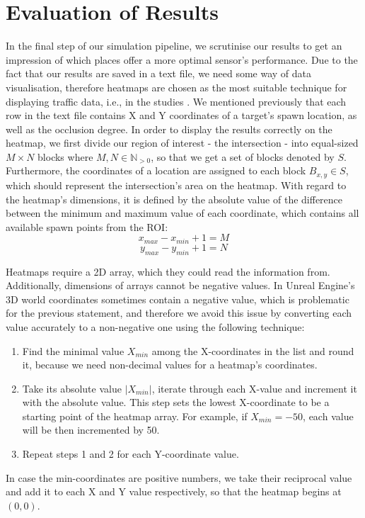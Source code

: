  \section{Evaluation of Results}
 In the final step of our simulation pipeline, we scrutinise our results to get an impression of which places offer a more optimal sensor's performance. Due to the fact that our results are saved in a text file, we need some way of data visualisation, therefore heatmaps are chosen as the most suitable technique for displaying traffic data, i.e., in the studies \cite{heatmap_first, heatmap_second}. We mentioned previously that each row in the text file contains X and Y coordinates of a target's spawn location, as well as the occlusion degree. In order to display the results correctly on the heatmap, we first divide our region of interest - the intersection - into equal-sized $M \times N$ blocks where $M,N \in \mathbb{N}_{>0}$, so that we get a set of blocks denoted by $S$. Furthermore, the coordinates of a location are assigned to each block $B_{x,y} \in S$, which should represent the intersection's area on the heatmap. With regard to the heatmap's dimensions, it is defined by the absolute value of the difference between the minimum and maximum value of each coordinate, which contains all available spawn points from the ROI:
 \begin{equation}
     x_{max} - x_{min} + 1 = M
 \end{equation}
 \begin{equation}
     y_{max} - y_{min} + 1 = N
 \end{equation}
 
 Heatmaps require a 2D array, which they could read the information from. Additionally, dimensions of arrays cannot be negative values. In Unreal Engine's 3D world coordinates sometimes contain a negative value, which is problematic for the previous statement, and therefore we avoid this issue by converting each value accurately to a non-negative one using the following technique:
 \begin{enumerate}
     \item Find the minimal value $X_{min}$ among the X-coordinates in the list and round it, because we need non-decimal values for a heatmap's coordinates.
     \item Take its absolute value $|X_{min}|$, iterate through each X-value and increment it with the absolute value. This step sets the lowest X-coordinate to be a starting point of the heatmap array. For example, if $X_{min} = -50$, each value will be then incremented by 50.  
     \item Repeat steps 1 and 2 for each Y-coordinate value.
 \end{enumerate}
 In case the min-coordinates are positive numbers, we take their reciprocal value and add it to each X and Y value respectively, so that the heatmap begins at $(0,0)$.
 
